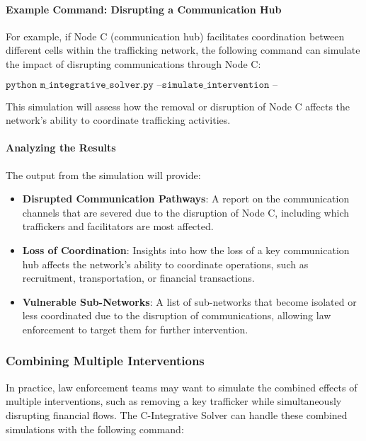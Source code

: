 \documentclass[%
 preprint, linenumbers,
 amsmath,amssymb,
 aps, physrev,
]{revtex4-2}
\begin{document}
\paragraph{Example Command: Disrupting a Communication Hub}

For example, if Node C (communication hub) facilitates coordination between different cells within the trafficking network, the following command can simulate the impact of disrupting communications through Node C:

\[
\texttt{python m\_integrative\_solver.py --simulate\_intervention --disrupt\_communication --node\_id 310}
\]

This simulation will assess how the removal or disruption of Node C affects the network’s ability to coordinate trafficking activities.

\paragraph{Analyzing the Results}

The output from the simulation will provide:
\begin{itemize}
    \item \textbf{Disrupted Communication Pathways}: A report on the communication channels that are severed due to the disruption of Node C, including which traffickers and facilitators are most affected.
    \item \textbf{Loss of Coordination}: Insights into how the loss of a key communication hub affects the network’s ability to coordinate operations, such as recruitment, transportation, or financial transactions.
    \item \textbf{Vulnerable Sub-Networks}: A list of sub-networks that become isolated or less coordinated due to the disruption of communications, allowing law enforcement to target them for further intervention.
\end{itemize}

\subsubsection{Combining Multiple Interventions}

In practice, law enforcement teams may want to simulate the combined effects of multiple interventions, such as removing a key trafficker while simultaneously disrupting financial flows. The C-Integrative Solver can handle these combined simulations with the following command:
\end{document}
